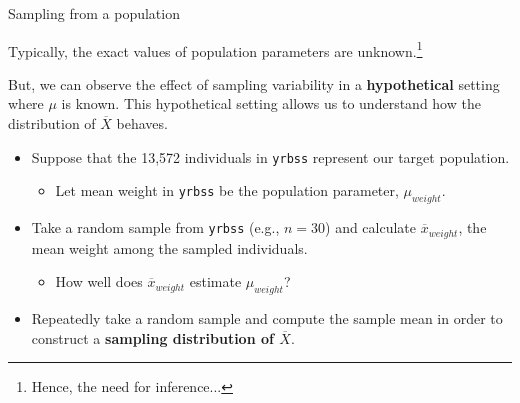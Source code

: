\documentclass[
  ignorenonframetext,
  aspectratio=169]{beamer}
\providecommand{\tightlist}{%
  \setlength{\itemsep}{0pt}\setlength{\parskip}{0pt}}
\begin{document}
\begin{frame}[fragile]{Sampling from a population}
\protect\hypertarget{sampling-from-a-population}{}
\small

Typically, the exact values of population parameters are
unknown.\footnote{Hence, the need for inference...}

But, we can observe the effect of sampling variability in a
\textbf{hypothetical} setting where \(\mu\) is known. This hypothetical
setting allows us to understand how the distribution of \(\overline{X}\)
behaves.

\begin{itemize}
\item
  Suppose that the 13,572 individuals in \texttt{yrbss} represent our
  target population.

  \begin{itemize}
  \tightlist
  \item
    Let mean weight in \texttt{yrbss} be the population parameter,
    \(\mu_{weight}\).
  \end{itemize}
\item
  Take a random sample from \texttt{yrbss} (e.g., \(n = 30\)) and
  calculate \(\overline{x}_{weight}\), the mean weight among the sampled
  individuals.

  \begin{itemize}
  \tightlist
  \item
    How well does \(\overline{x}_{weight}\) estimate \(\mu_{weight}\)?
  \end{itemize}
\item
  Repeatedly take a random sample and compute the sample mean in order
  to construct a \textbf{sampling distribution of \(\overline{X}\)}.
\end{itemize}
\end{frame}
\end{document}
